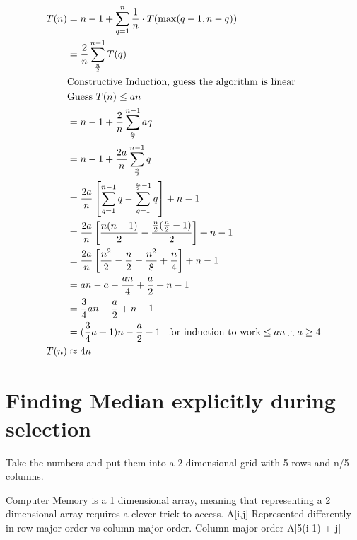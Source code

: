 \documentclass[english, 10pt]{article}
\begin{document}
\begin{align*}
    T(n) &= n-1 + \sum_{q=1}^{n}\frac{1}{n}\cdot T(\max(q-1,n-q)) \\
    &= \frac{2}{n}\sum_{\frac{n}{2}}^{n-1}T(q) \\
    &\text{Constructive Induction, guess the algorithm is linear} \\
    &\text{Guess } T(n) \le an \\
    &= n-1 + \frac{2}{n}\sum_{\frac{n}{2}}^{n-1}aq \\
    &= n-1 + \frac{2a}{n}\sum_{\frac{n}{2}}^{n-1}q \\
    &= \frac{2a}{n}\left[ \sum_{q=1}^{n-1}q - \sum_{q=1}^{\frac{n}{2}-1}q \right] + n-1 \\
    &= \frac{2a}{n}\left[ \frac{n(n-1)}{2}-\frac{\frac{n}{2}(\frac{n}{2}-1)}{2} \right] + n -1 \\
    &= \frac{2a}{n}\left[ \frac{n^2}{2}-\frac{n}{2}-\frac{n^2}{8}+\frac{n}{4}\right] + n -1 \\
    &= an -a -\frac{an}{4}+\frac{a}{2} +n -1 \\
    &= \frac{3}{4}an - \frac{a}{2} + n -1 \\
    &= (\frac{3}{4}a + 1)n - \frac{a}{2}-1  \;\;\;\text{for induction to work} \le an \therefore a \ge 4 \\
    T(n) &\approx 4n \\
\end{align*}


\section{Finding Median explicitly during selection}

Take the numbers and put them into a 2 dimensional grid with 5 rows and n/5 columns.

Computer Memory is a 1 dimensional array, meaning that representing a 2
dimensional array requires a clever trick to access.  A[i,j] Represented
differently in row major order vs column major order.  Column major order
A[5(i-1) + j]%
\end{document}
